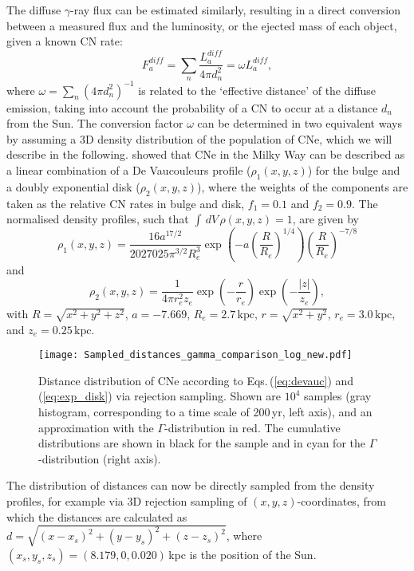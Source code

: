 \documentclass{aa}
\newcommand{\mrm}[1]{\mathrm{#1}}
\begin{document}
The diffuse $\gamma$-ray flux can be estimated similarly, resulting in a direct conversion between a measured flux and the luminosity, or the ejected mass of each object, given a known CN rate:
%
\begin{equation}
F_{a}^{diff} = \sum_n \frac{L_a^{diff}}{4 \pi d_n^2} = \omega L_a^{diff}\mrm{,}
\label{eq:flux_diff_inf_sum}
\end{equation}
%
where $\omega = \sum_n (4 \pi d_n^2)^{-1}$ is related to the `effective distance' of the diffuse emission, taking into account the probability of a CN to occur at a distance $d_n$ from the Sun.
%
The conversion factor $\omega$ can be determined in two equivalent ways by assuming a 3D density distribution of the population of CNe, which we will describe in the following.
%
\citet{Shafter2017_novarate} showed that CNe in the Milky Way can be described as a linear combination of a De Vaucouleurs profile ($\rho_1(x,y,z)$) for the bulge and a doubly exponential disk ($\rho_2(x,y,z)$), where the weights of the components are taken as the relative CN rates in bulge and disk, $f_1 = 0.1$ and $f_2 = 0.9$.
%
The normalised density profiles, such that $\int\,dV\,\rho(x,y,z) = 1$, are given by
%
\begin{equation}
	\rho_1(x,y,z) = \frac{16 a^{17/2}}{2027025 \pi^{3/2} R_e^3} \exp\left(-a\left(\frac{R}{R_e}\right)^{1/4}\right)\left(\frac{R}{R_e}\right)^{-7/8}
	\label{eq:devauc}
\end{equation}
%
and
%
\begin{equation}
	\rho_2(x,y,z) = \frac{1}{4 \pi r_e^2 z_e} \exp\left(-\frac{r}{r_e}\right) \exp\left(-\frac{|z|}{z_e}\right)\mrm{,}
	\label{eq:exp_disk}
\end{equation}
%
with $R = \sqrt{x^2 + y^2 + z^2}$, $a = -7.669$, $R_e = 2.7\,\mrm{kpc}$, $r = \sqrt{x^2 + y^2}$, $r_e = 3.0\,\mrm{kpc}$, and $z_e = 0.25\,\mrm{kpc}$.
%
\begin{figure}[!hbtp]
	\centering
	\texttt{[image: Sampled\_distances\_gamma\_comparison\_log\_new.pdf]}
	\caption{Distance distribution of CNe according to Eqs.\,(\ref{eq:devauc}) and (\ref{eq:exp_disk}) via rejection sampling. Shown are $10^4$ samples (gray histogram, corresponding to a time scale of 200\,yr, left axis), and an approximation with the $\Gamma$-distribution in red. The cumulative distributions are shown in black for the sample and in cyan for the $\Gamma$-distribution (right axis).}
	\label{fig:distance_samples}
\end{figure}
%
The distribution of distances can now be directly sampled from the density profiles, for example via 3D rejection sampling of $(x,y,z)$-coordinates, from which the distances are calculated as $d = \sqrt{(x-x_s)^2+(y-y_s)^2+(z-z_s)^2}$, where $(x_s,y_s,z_s) = (8.179,0,0.020)$\,kpc is the position of the Sun.
\end{document}

